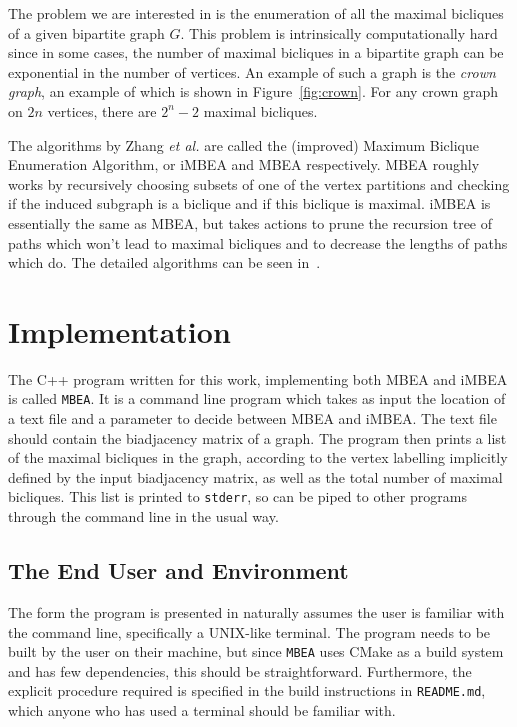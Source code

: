 \par
The problem we are interested in is the enumeration of all the maximal bicliques of a given bipartite graph $G$.
This problem is intrinsically computationally hard since in some cases, the number of maximal bicliques in a bipartite graph can be exponential in the number of vertices.
An example of such a graph is the \emph{crown graph}, an example of which is shown in Figure~\ref{fig:crown}.
For any crown graph on $2n$ vertices, there are $2^n - 2$ maximal bicliques.

\par
The algorithms by Zhang \emph{et al.} are called the (improved) Maximum Biclique Enumeration Algorithm, or iMBEA and MBEA respectively.
MBEA roughly works by recursively choosing subsets of one of the vertex partitions and checking if the induced subgraph is a biclique and if this biclique is maximal.
iMBEA is essentially the same as MBEA, but takes actions to prune the recursion tree of paths which won't lead to maximal bicliques and to decrease the lengths of paths which do.
The detailed algorithms can be seen in~\cite[Algorithm: MBEA]{Zhang2014}.

\section{Implementation}
The C++ program written for this work, implementing both MBEA and iMBEA is called \texttt{MBEA}.
It is a command line program which takes as input the location of a text file and a parameter to decide between MBEA and iMBEA.
The text file should contain the biadjacency matrix of a graph.
The program then prints a list of the maximal bicliques in the graph, according to the vertex labelling implicitly defined by the input biadjacency matrix, as well as the total number of maximal bicliques.   
This list is printed to \texttt{stderr}, so can be piped to other programs through the command line in the usual way.
\subsection{The End User and Environment}
The form the program is presented in naturally assumes the user is familiar with the command line, specifically a UNIX-like terminal.
The program needs to be built by the user on their machine, but since \texttt{MBEA} uses CMake as a build system and has few dependencies, this should be straightforward.
Furthermore, the explicit procedure required is specified in the build instructions in \texttt{README.md}, which anyone who has used a terminal should be familiar with.
\par

